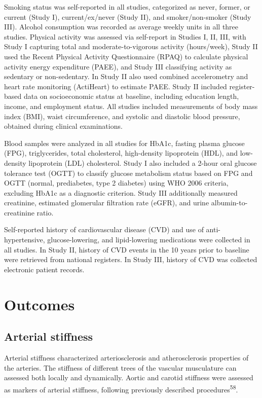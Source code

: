 \documentclass[
  a4paper,
  headsepline=true,
  open=any]{scrbook}
\begin{document}
Smoking status was self-reported in all studies, categorized as never,
former, or current (Study I), current/ex/never (Study II), and
smoker/non-smoker (Study III). Alcohol consumption was recorded as
average weekly units in all three studies. Physical activity was
assessed via self-report in Studies I, II, III, with Study I capturing
total and moderate-to-vigorous activity (hours/week), Study II used the
Recent Physical Activity Questionnaire (RPAQ) to calculate physical
activity energy expenditure (PAEE), and Study III classifying activity
as sedentary or non-sedentary. In Study II also used combined
accelerometry and heart rate monitoring (ActiHeart) to estimate PAEE.
Study II included register-based data on socioeconomic status at
baseline, including education length, income, and employment status. All
studies included measurements of body mass index (BMI), waist
circumference, and systolic and diastolic blood pressure, obtained
during clinical examinations.

Blood samples were analyzed in all studies for HbA1c, fasting plasma
glucose (FPG), triglycerides, total cholesterol, high-density
lipoprotein (HDL), and low-density lipoprotein (LDL) cholesterol. Study
I also included a 2-hour oral glucose tolerance test (OGTT) to classify
glucose metabolism status based on FPG and OGTT (normal, prediabetes,
type 2 diabetes) using WHO 2006 criteria, excluding HbA1c as a
diagnostic criterion. Study III additionally measured creatinine,
estimated glomerular filtration rate (eGFR), and urine
albumin-to-creatinine ratio.

Self-reported history of cardiovascular disease (CVD) and use of
anti-hypertensive, glucose-lowering, and lipid-lowering medications were
collected in all studies. In Study II, history of CVD events in the 10
years prior to baseline were retrieved from national registers. In Study
III, history of CVD was collected electronic patient records.

\hypertarget{outcomes}{%
\section{Outcomes}\label{outcomes}}

\hypertarget{arterial-stiffness}{%
\subsection{Arterial stiffness}\label{arterial-stiffness}}

Arterial stiffness characterized arteriosclerosis and atherosclerosis
properties of the arteries. The stiffness of different trees of the
vascular musculature can assessed both locally and dynamically. Aortic
and carotid stiffness were assessed as markers of arterial stiffness,
following previously described procedures\textsuperscript{58}.
\end{document}
